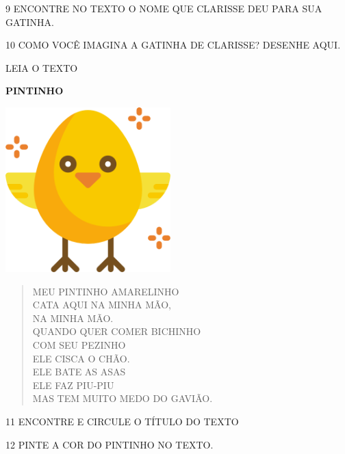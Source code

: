 \num{9} ENCONTRE NO TEXTO O NOME QUE CLARISSE DEU PARA SUA GATINHA.


\num{10} COMO VOCÊ IMAGINA A GATINHA DE CLARISSE? DESENHE AQUI.

\begin{mdframed}[linewidth=2pt,linecolor=salmao,roundcorner=2pt]
\vspace{10cm}
\end{mdframed}

LEIA O TEXTO

\textbf{PINTINHO}

\includegraphics[width=2.51042in,height=2.51042in]{media/image129.png}
\begin{verse}
MEU PINTINHO AMARELINHO\\
CATA AQUI NA MINHA MÃO,\\
NA MINHA MÃO.\\
QUANDO QUER COMER BICHINHO\\
COM SEU PEZINHO\\
ELE CISCA O CHÃO.\\
ELE BATE AS ASAS\\
ELE FAZ PIU-PIU\\
MAS TEM MUITO MEDO DO GAVIÃO.
\end{verse}



\num{11} ENCONTRE E CIRCULE O TÍTULO DO TEXTO

\num{12} PINTE A COR DO PINTINHO NO TEXTO.


